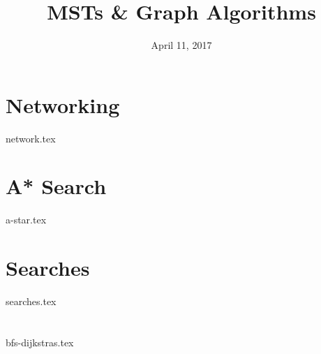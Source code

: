 \documentclass{exam}
\title{MSTs \& Graph Algorithms}
\date{April 11, 2017}
\begin{document}
\maketitle

\section{Networking}
\begin{questions}
{network.tex}
\end{questions}

\clearpage

\section{A* Search}
\begin{questions}
{a-star.tex}
\end{questions}

\clearpage

\section{Searches}
\begin{questions}
{searches.tex}
\end{questions}

\section{}
\begin{questions}
{bfs-dijkstras.tex}
\end{questions}
\end{document}
